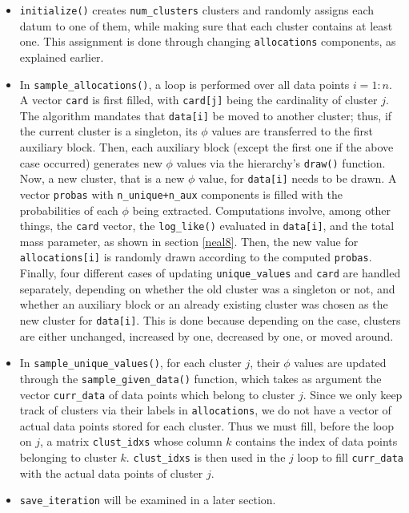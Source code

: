 \begin{itemize}
	\item \verb|initialize()| creates \verb|num_clusters| clusters and randomly assigns each datum to one of them, while making sure that each cluster contains at least one.
	This assignment is done through changing \verb|allocations| components, as explained earlier.
	\item In \verb|sample_allocations()|, a loop is performed over all data points $i=1:n$.
	A vector \verb|card| is first filled, with \verb|card[j]| being the cardinality of cluster $j$.
	The algorithm mandates that \verb|data[i]| be moved to another cluster; thus, if the current cluster is a singleton, its $\phi$ values are transferred to the first auxiliary block.
	Then, each auxiliary block (except the first one if the above case occurred) generates new $\phi$ values via the hierarchy's \verb|draw()| function.
	Now, a new cluster, that is a new $\phi$ value, for \verb|data[i]| needs to be drawn.
	A vector \verb|probas| with \verb|n_unique+n_aux| components is filled with the probabilities of each $\phi$ being extracted.
	Computations involve, among other things, the \verb|card| vector, the \verb|log_like()| evaluated in \verb|data[i]|, and the total mass parameter, as shown in section \ref{neal8}.
	Then, the new value for \verb|allocations[i]| is randomly drawn according to the computed \verb|probas|.
	Finally, four different cases of updating \verb|unique_values| and \verb|card| are handled separately, depending on whether the old cluster was a singleton or not, and whether an auxiliary block or an already existing cluster was chosen as the new cluster for \verb|data[i]|.
	This is done because depending on the case, clusters are either unchanged, increased by one, decreased by one, or moved around. %
	\item In \verb|sample_unique_values()|, for each cluster $j$, their $\phi$ values are updated through the \verb|sample_given_data()| function, which takes as argument the vector \verb|curr_data| of data points which belong to cluster $j$.
	Since we only keep track of clusters via their labels in \verb|allocations|, we do not have a vector of actual data points stored for each cluster.
	Thus we must fill, before the loop on $j$, a matrix \verb|clust_idxs| whose column $k$ contains the index of data points belonging to cluster $k$.
	\verb|clust_idxs| is then used in the $j$ loop to fill \verb|curr_data| with the actual data points of cluster $j$.
	\item \verb|save_iteration| will be examined in a later section.
\end{itemize}

